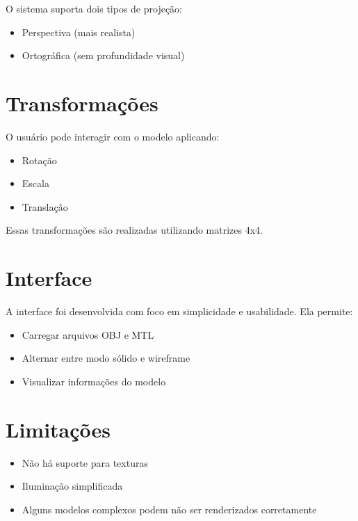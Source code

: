 \documentclass[12pt,a4paper]{article}
\begin{document}
O sistema suporta dois tipos de projeção:

\begin{itemize}
    \item Perspectiva (mais realista)
    \item Ortográfica (sem profundidade visual)
\end{itemize}

\section{Transformações}

O usuário pode interagir com o modelo aplicando:

\begin{itemize}
    \item Rotação
    \item Escala
    \item Translação
\end{itemize}

Essas transformações são realizadas utilizando matrizes 4x4.

\section{Interface}

A interface foi desenvolvida com foco em simplicidade e usabilidade. Ela permite:

\begin{itemize}
    \item Carregar arquivos OBJ e MTL
    \item Alternar entre modo sólido e wireframe
    \item Visualizar informações do modelo
\end{itemize}

\section{Limitações}

\begin{itemize}
    \item Não há suporte para texturas
    \item Iluminação simplificada
    \item Alguns modelos complexos podem não ser renderizados corretamente
\end{itemize}
\end{document}
